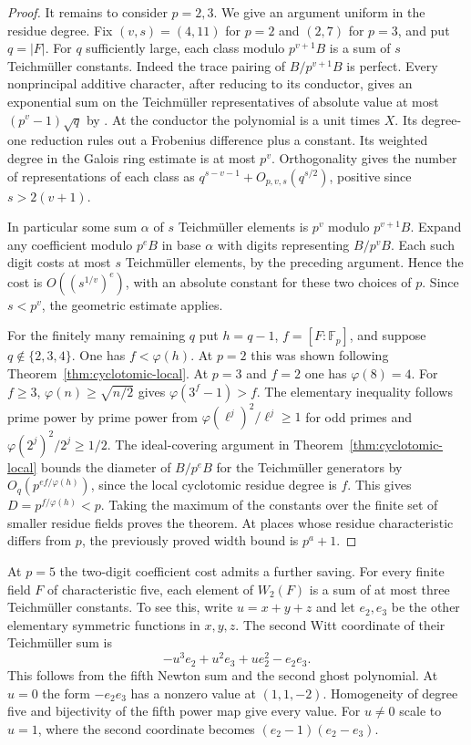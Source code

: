 \documentclass[11pt,letterpaper]{article}
\theoremstyle{definition}
\numberwithin{equation}{section}
\begin{document}
\begin{proof}
It remains to consider $p=2,3$. We give an argument uniform in
the residue degree. Fix $(v,s)=(4,11)$ for $p=2$ and $(2,7)$ for
$p=3$, and put $q=|F|$. For $q$ sufficiently large, each class
modulo $p^{v+1}B$ is a sum of $s$ Teichm\"uller constants.
Indeed the trace pairing of $B/p^{v+1}B$ is perfect. Every
nonprincipal additive character, after reducing to its conductor,
gives an exponential sum on the Teichm\"uller representatives of
absolute value at most $(p^v-1)\sqrt q$ by \cite{hkhc}.
At the conductor the polynomial is a unit times $X$. Its degree-one
reduction rules out a Frobenius difference plus a constant.
Its weighted degree in the Galois ring estimate is at most $p^v$.
Orthogonality gives the number of representations of each class as
$q^{s-v-1}+O_{p,v,s}(q^{s/2})$, positive since $s>2(v+1)$.

In particular some sum $\alpha$ of $s$ Teichm\"uller elements
is $p^v$ modulo $p^{v+1}B$. Expand any coefficient modulo $p^eB$
in base $\alpha$ with digits representing $B/p^vB$.
Each such digit costs at most $s$ Teichm\"uller elements, by the
preceding argument. Hence the cost is $O((s^{1/v})^e)$, with an
absolute constant for these two choices of $p$. Since $s<p^v$,
the geometric estimate applies.

For the finitely many remaining $q$ put $h=q-1$, $f=[F:\mathbb F_p]$,
and suppose $q\notin\{2,3,4\}$. One has $f<\varphi(h)$.
At $p=2$ this was shown following Theorem~\ref{thm:cyclotomic-local}.
At $p=3$ and $f=2$ one has $\varphi(8)=4$.
For $f\ge3$, $\varphi(n)\ge\sqrt{n/2}$ gives
$\varphi(3^f-1)>f$. The elementary inequality follows prime power
by prime power from $\varphi(\ell^j)^2/\ell^j\ge1$ for odd primes
and $\varphi(2^j)^2/2^j\ge1/2$.
The ideal-covering argument in Theorem~\ref{thm:cyclotomic-local}
bounds the diameter of $B/p^eB$ for the Teichm\"uller generators by
$O_q(p^{ef/\varphi(h)})$, since the local cyclotomic residue degree
is $f$. This gives $D=p^{f/\varphi(h)}<p$. Taking the maximum of
the constants over the finite set of smaller residue fields proves
the theorem. At places whose residue characteristic differs from $p$,
the previously proved width bound is $p^a+1$.
\end{proof}

At $p=5$ the two-digit coefficient cost admits a further saving.
For every finite field $F$ of characteristic five, each element of
$W_2(F)$ is a sum of at most three Teichm\"uller constants. To see
this, write $u=x+y+z$ and let $e_2,e_3$ be the other elementary
symmetric functions in $x,y,z$. The second Witt coordinate of their
Teichm\"uller sum is
\[
               -u^3 e_2+u^2e_3+u e_2^2-e_2e_3 .
\]
This follows from the fifth Newton sum and the second ghost polynomial.
At $u=0$ the form $-e_2e_3$ has a nonzero value at $(1,1,-2)$.
Homogeneity of degree five and bijectivity of the fifth power map
give every value. For $u\ne0$ scale to $u=1$, where the second
coordinate becomes $(e_2-1)(e_2-e_3)$.
\end{document}
